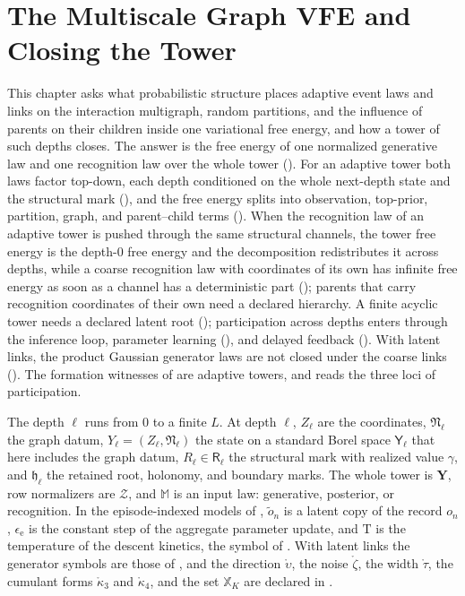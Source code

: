 \chapter{The Multiscale Graph VFE and Closing the Tower}
\label{ch:full-graph-meta-agent-vfe}

This chapter asks what probabilistic structure places adaptive event laws and links
on the interaction multigraph, random partitions, and the influence of parents
on their children inside one variational free energy, and how a tower of such depths
closes. The answer is the free energy of one normalized generative law and one
recognition law over the whole tower (). For an
adaptive tower both laws factor top-down, each depth conditioned on the whole
next-depth state and the structural mark (),
and the free energy splits into observation, top-prior, partition, graph, and
parent--child terms (). When the recognition law of an
adaptive tower is pushed through the same structural channels, the tower free energy is the
depth-$0$ free energy and the decomposition redistributes it across depths, while a coarse
recognition law with coordinates of its own has infinite free energy as soon as a channel has a
deterministic part (); parents that carry recognition
coordinates of their own need a declared hierarchy. A finite acyclic tower
needs a declared latent root ();
participation across depths enters through the inference loop, parameter learning
(), and delayed feedback
(). With latent links, the
product Gaussian generator laws are not closed under the coarse links
(). The formation witnesses of
 are adaptive towers, and  reads
the three loci of participation.

The depth $\ell$ runs from $0$ to a finite $L$. At depth $\ell$, $Z_\ell$ are the
coordinates, $\mathfrak N_\ell$ the graph datum, $Y_\ell=(Z_\ell,\mathfrak N_\ell)$ the
state on a standard Borel space $\mathsf Y_\ell$ that here includes the graph datum,
$R_\ell\in\mathsf R_\ell$ the structural mark with realized value $\gamma$, and
$\mathfrak h_\ell$ the retained root, holonomy, and boundary marks. The whole tower is
$\mathbf Y$, row normalizers are $\mathcal Z$, and $\mathbb M$ is an input law:
generative, posterior, or recognition. In the episode-indexed models of
, $\widetilde o_n$ is a latent copy of the record $o_n$,
$\epsilon_{\mathrm e}$ is the constant step of the aggregate parameter update, and
$\mathrm T$ is the temperature of the descent kinetics, the symbol of
. With latent links the generator symbols are those of
, and the direction $\mathring\upsilon$, the noise $\mathring\zeta$, the width
$\mathring\tau$, the cumulant forms $\mathring\kappa_3$ and $\mathring\kappa_4$, and the set $\mathbb X_K$
are declared in .

